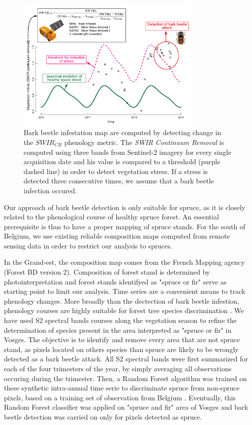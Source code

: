 \documentclass[3p,procedia]{elsarticle}
\begin{document}
\begin{figure}
	\centering
	\includegraphics[width=0.8\textwidth]{fctHarmo.png}
	\caption{Bark beetle infestation map are computed by detecting change in the $SWIR_{CR}$ phenology metric. The \textit{SWIR Continuum Removal} is computed using three bands from Sentinel-2 imagery for every single acquisition date and his value is compared to a threshold (purple dashed line) in order to detect vegetation stress. If a stress is detected three consecutive times, we assume that a bark beetle infection occured.}
	\label{fig:harmo}
\end{figure}

Our approach of bark beetle detection is only suitable for spruce, as it is closely related to the phenological course of healthy spruce forest.
An essential prerequisite is thus to have a proper mapping of spruce stands.
For the south of Belgium, we use existing reliable composition maps \citep{bolyn_mapping_2022} computed from remote sensing data in order to restrict our analysis to spruces.

In the Grand-est, the composition map comes from the French Mapping agency (Forest BD version 2). 
Composition of forest stand is determined by photointerpretation and forest stands identifyed as "spruce or fir" serve as starting point to limit our analysis.
Time series are a convenient means to track phenology changes. 
More broadly than the dectection of bark beetle infestion, phenology courses are highly suitable for forest tree species discrimination \citep{lisein_discrimination_2015,grabska_forest_2019,ma_tree_2021}.
We have used S2 spectral bands courses along the vegetation season to refine the determination of species present in the area interpreted as "spruce or fir" in Vosges.
The objective is to identify and remove every area that are not spruce stand, as pixels located on others species than spruce are likely to be wrongly detected as a bark beetle attack.
All S2 spectral bands were first summarized for each of the four trimesters of the year, by simply averaging all observations occuring during the trimester.
Then, a Random Forest algorithm was trained on these synthetic intra-annual time serie to discriminate spruce from non-spruce pixels, based on a training set of observation from Belgium \citep{bolyn_forest_2018}.
Eventually, this Random Forest classifier was applied on "spruce and fir" area of Vosges and bark beetle detection was carried on only for pixels detected as spruce. 
\end{document}
